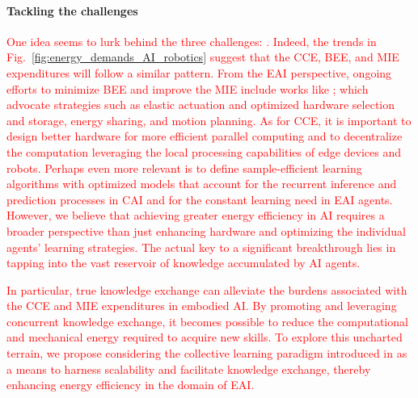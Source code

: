 \documentclass[12pt]{article}
\newcommand\myhl[1]{\textcolor{red}{#1}}
\renewcommand{\emph}[1]{\textit{#1}}
\begin{document}
\paragraph*{\textbf{Tackling the challenges}}
\myhl{One idea seems to lurk behind the three challenges: \emph{\say{more AI applications, more energy demand}}. Indeed, the trends in Fig.~\ref{fig:energy_demands_AI_robotics} suggest that the CCE, BEE, and MIE expenditures will follow a similar pattern. From the EAI perspective, ongoing efforts to minimize BEE and improve the MIE include works like \cite{schroder2014, chalmers2015, mohammed2014, chemnitz2011}; which advocate strategies such as elastic actuation and optimized hardware selection and storage, energy sharing, and motion planning. As for CCE, it is important to design better hardware for more efficient parallel computing and to decentralize the computation leveraging the local processing capabilities of edge devices and robots. Perhaps even more relevant is to define sample-efficient learning algorithms with optimized models that account for the recurrent inference and prediction processes in CAI and for the constant learning need in EAI agents. However, we believe that achieving greater energy efficiency in AI requires a broader perspective than just enhancing hardware and optimizing the individual agents' learning strategies. The actual key to a significant breakthrough lies in tapping into the vast reservoir of knowledge accumulated by AI agents.} 

\myhl{In particular, true knowledge exchange can alleviate the burdens associated with the CCE and MIE expenditures in embodied AI. By promoting and leveraging concurrent knowledge exchange, it becomes possible to reduce the computational and mechanical energy required to acquire new skills. To explore this uncharted terrain, we propose considering the collective learning paradigm introduced in \cite{Haddadin2014SystemzumErstellen,Haddadin2015Systemgeneratingsets} as a means to harness scalability and facilitate knowledge exchange, thereby enhancing energy efficiency in the domain of EAI.}


\end{document}
